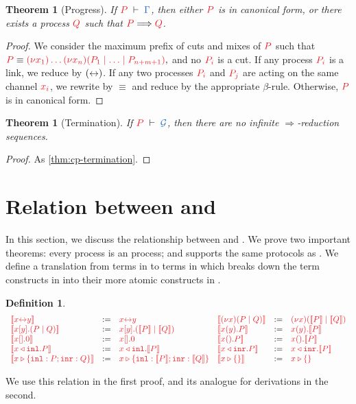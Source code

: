 \documentclass[submission,copyright,creativecommons]{eptcs}
\def\coloneqq{\mathbin{:=}}
\newtheorem{theorem}[lemma]{Theorem}
\newtheorem{definition}[lemma]{Definition}
\begin{document}
\begin{theorem}[Progress]\label{thm:hcp-progress}
  If $\seq[P]{\Gamma}$, then either $\tm{P}$ is in canonical form, or there exists a process $\tm{Q}$ such that $\tm{P}\Longrightarrow\tm{Q}$.
\end{theorem} 
\begin{proof}
  We consider the maximum prefix of cuts and mixes of $\tm{P}$ such that
  \(
  \tm{P} \equiv \tm{\piNew{x_1}{\dots\piNew{x_n}{(P_1 \ppar \dots \ppar P_{n+m+1})}}},
  \)
  and no $\tm{P_i}$ is a cut. If any process $\tm{P_i}$ is a link, we reduce by $({\leftrightarrow})$. If any two processes $\tm{P_i}$ and $\tm{P_j}$ are acting on the same channel $\tm{x_i}$, we rewrite by $\equiv$ and reduce by the appropriate $\beta$-rule. Otherwise, $\tm{P}$ is in canonical form.
\end{proof}
\begin{theorem}[Termination]\label{thm:hcp-termination}
  If $\seq[P]{\mathcal{G}}$, then there are no infinite $\Longrightarrow$-reduction sequences.
\end{theorem} 
\begin{proof}
  As \cref{thm:cp-termination}.
\end{proof}



\section{Relation between \cp and \hcp}
\label{sec:cp2hcp}

In this section, we discuss the relationship between \cp and \hcp. We prove two important theorems: every \cp process is an \hcp process; and \hcp supports the same protocols as \cp. We define a translation from terms in \cp to terms in \hcp which breaks down the term constructs in \cp into their more atomic constructs in \hcp.
\begin{definition}\label{def:cp2hcp-terms}
  \[
    \begin{array}{lcllcl}
         \tm{\mtf{\cpLink{x}{y}}}
      &  \coloneqq & \tm{\cpLink{x}{y}}
      &  \tm{\mtf{\cpCut{x}{P}{Q}}}
      &  \coloneqq & \tm{\piNew{x}{(\piPar{\mtf{P}}{\mtf{Q}})}}
      \\ \tm{\mtf{\cpSend{x}{y}{P}{Q}}}
      &  \coloneqq & \tm{\piBoundSend{x}{y}{(\piPar{\mtf{P}}{\mtf{Q}})}}
      &  \tm{\mtf{\cpRecv{x}{y}{P}}}
      &  \coloneqq & \tm{\piRecv{x}{y}{\mtf{P}}}
      \\ \tm{\mtf{\cpHalt{x}}}
      &  \coloneqq & \tm{\piBoundSend{x}{}{\piHalt}}
      &  \tm{\mtf{\cpWait{x}{P}}}
      &  \coloneqq & \tm{\piRecv{x}{}{\mtf{P}}}
      \\ \tm{\mtf{\cpInl{x}{P}}}
      &  \coloneqq & \tm{\cpInl{x}{\mtf{P}}}
      &  \tm{\mtf{\cpInr{x}{P}}}
      &  \coloneqq & \tm{\cpInr{x}{\mtf{P}}}
      \\ \tm{\mtf{\cpCase{x}{P}{Q}}}
      &  \coloneqq & \tm{\cpCase{x}{\mtf{P}}{\mtf{Q}}}
      &  \tm{\mtf{\cpAbsurd{x}}}
      &  \coloneqq & \tm{\cpAbsurd{x}}
    \end{array}
  \]
\end{definition}\noindent
We use this relation in the first proof, and its analogue for derivations in the second.
\end{document}
